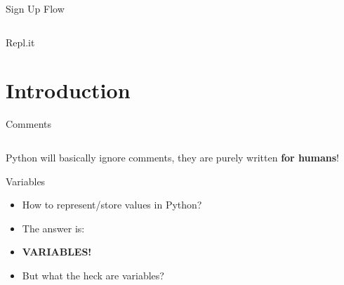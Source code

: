 \begin{frame}{Sign Up Flow}
\begin{columns}
\begin{column}{0.33\textwidth}
			\end{column}
		\end{columns}	
		\end{frame}

		\begin{frame}{Repl.it}
		\end{frame}

	\section{Introduction}
		
		\begin{frame}{Comments}
			\LARGE
			\inputminted[frame=single,framesep=2pt]{python3}{code-examples/comments.py}
			Python will basically ignore comments, they are purely written \textbf{for humans}!
		\end{frame}

		\begin{frame}{Variables}
			\LARGE
			\begin{itemize}
				\pause
				\item How to represent/store values in Python?
				\pause
				\item The answer is:
				\item \huge{\textbf{VARIABLES!}}
				\vspace{5mm}
				\pause
				\item But what the heck are variables?
			\end{itemize}
		\end{frame}
		
